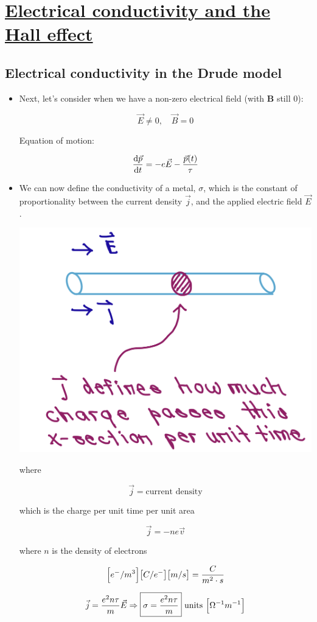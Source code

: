 \section[Electrical conductivity and the Hall effect]{\hyperlink{toc}{Electrical conductivity and the Hall effect}}


\subsection{Electrical conductivity in the Drude model}

\begin{itemize}
    \item Next, let's consider when we have a non-zero electrical field (with $\mathbf{B}$ still 0):
    
    \[ \vec{E} \neq 0, \quad \vec{B} = 0 \]

    Equation of motion:

    \[ \dv{\vec{p}}{t} = -e \vec{E} - \frac{\vec{p}(t)}{\tau} \]

    \item We can now define the conductivity of a metal, $\sigma$, which is the constant of proportionality between the current density $\vec{j}$, and the applied electric field $\vec{E}$.
    
    \begin{center}
        \includegraphics[width = 0.3 \linewidth]{Images/current-density.png}
    \end{center}

    where

    \[\vec{j} = \text{current density} \]
    
    which is the charge per unit time per unit area

    \[ \vec{j} = - n e \vec{v} \]

    where $n$ is the density of electrons   

    \[ \brackets*{e^-/m^3}\brackets*{C/e^-} \brackets*{m/s} = \frac{C}{m^2 \cdot s} \]

    \[ \vec{j} = \frac{e^2 n \tau}{m} \vec{E} \Rightarrow \boxed{\sigma = \frac{e^2 n \tau}{m}} \text{ units } \brackets*{\Omega^{-1} m^{-1}}\]


\end{itemize}
